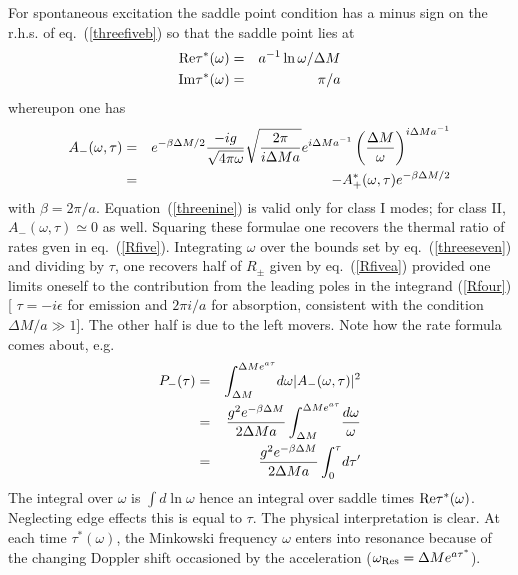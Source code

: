 \documentclass[12pt,oneside]{report}
\def\om{\omega	}
\def\p {\prime}
\begin{document}
For spontaneous excitation the saddle point condition has a  minus sign
on the r.h.s. of eq.~(\ref{threefiveb}) so that the saddle point lies at
\begin{eqnarray}
{\rm Re} \tau^*(\om) &=&  a^{-1} \ln {\om / \Delta M}\nonumber\\
{\rm Im} \tau^*(\om) &=& \pi/a\label{threeeight}
\end{eqnarray}
whereupon  one has
\begin{eqnarray}
A_-(\om,\tau) &=& e^{- \beta \Delta M /2} {-i g \over \sqrt{4 \pi \om}}\sqrt{ 2
\pi \over i \Delta M a} e ^{ i \Delta M a^{-1}}
\left ( {\Delta M \over \om} \right)^{i \Delta M
a^{-1}} \nonumber\\
&=& - A^*_+(\om,\tau) e^{- \beta \Delta M /2}
\label{threenine}
\end{eqnarray}
with $\beta = 2 \pi / a$. Equation~(\ref{threenine}) is valid only for class I
modes; for class II, $A_-(\om,\tau)\simeq 0$ as well.  
Squaring these formulae one
recovers the thermal ratio of rates gven in eq.~(\ref{Rfive}). 
Integrating $\om$ over the
bounds set by eq.~(\ref{threeseven}) and dividing by $\tau$, one recovers half
of $R_\pm$ given by eq.~(\ref{Rfivea}) provided one limits oneself to the
contribution from the leading poles in the integrand (\ref{Rfour}) [ $\tau = -
i \epsilon$ for emission and $2 \pi i / a$ for absorption, consistent with the
condition $\Delta M / a \gg 1$]. The other half is due to the left movers. Note
how the rate formula comes about, e.g. 
\begin{eqnarray}
P_{-}(\tau)&=&\int_{\Delta M}^{\Delta M e^{a\tau}}\!d\om
\vert A_-(\om,\tau)\vert^2\nonumber\\
&=&{g^2 e^{-\beta \Delta M}
\over 2 \Delta M a}
\int_{\Delta M}^{\Delta M e^{a\tau}}\!{d\om\over \om}\nonumber\\
&=&{g^2 e^{-\beta \Delta M}
\over 2 \Delta M a}
\int_0^\tau \!d\tau^\p
\label{threenineb}
\end{eqnarray}
The integral over $\om$ is $\int d \ln \om$
hence an integral over saddle times ${\rm Re} \tau ^* (\om)$. Neglecting edge
effects this is equal to $\tau$. The physical interpretation is clear. At each
time $\tau^*(\om)$, the Minkowski frequency $\om$ enters into resonance because
of the changing Doppler shift occasioned by the acceleration ($\om_{\rm Res} =
\Delta M e^{a \tau^* }$).
\end{document}
